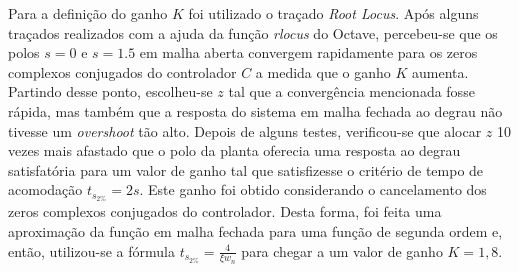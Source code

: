 Para a definição do ganho $K$ foi utilizado o traçado \textit{Root Locus}. Após
alguns traçados realizados com a ajuda da função \textit{rlocus} do Octave,
percebeu-se que os polos $s = 0$ e $s = 1.5$ em malha aberta convergem
rapidamente para os zeros complexos conjugados do controlador $C$ a medida que o
ganho $K$ aumenta. Partindo desse ponto, escolheu-se $z$ tal que a convergência
mencionada fosse rápida, mas também que a resposta do sistema em malha fechada
ao degrau não tivesse um \textit{overshoot} tão alto. Depois de alguns testes,
verificou-se que alocar $z$ 10 vezes mais afastado que o polo da planta oferecia
uma resposta ao degrau satisfatória para um valor de ganho tal que satisfizesse
o critério de tempo de acomodação $t_{s_{2\%}} = 2s$. Este ganho foi obtido
considerando o cancelamento dos zeros complexos conjugados do controlador. Desta
forma, foi feita uma aproximação da função em malha fechada para uma função de
segunda ordem e, então, utilizou-se a fórmula $t_{s_{2\%}} = \frac{4}{\xi
w_{n}}$ para chegar a um valor de ganho $K = 1,8$.